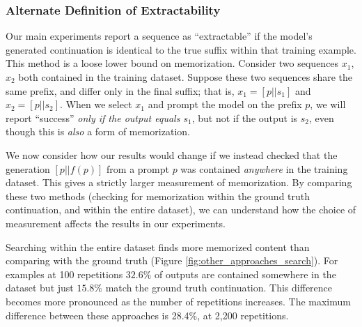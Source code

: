 \subsubsection{Alternate Definition of Extractability}
Our main experiments report a sequence as ``extractable'' if the model's generated continuation is identical to the true suffix within that training example.
This method is a loose lower bound on memorization.
Consider two sequences $x_1$, $x_2$ both contained in the training dataset.
Suppose these two sequences share the same prefix, and differ only in the final suffix;
that is, $x_1 = [p || s_1]$ and $x_2 = [p || s_2]$.
When we select $x_1$ and prompt the model on the prefix $p$, we will 
report ``success'' \emph{only if the output equals $s_1$}, but not if the output is $s_2$,
even though this is \emph{also} a form of memorization.
%

We now consider how our results would change if we instead checked that the generation $[p || f(p)]$ from a prompt $p$ was contained \emph{anywhere} in the training dataset. This gives a strictly larger measurement of memorization.
By comparing these two methods (checking for memorization within the ground truth continuation, and within the entire dataset), we can understand how the choice of measurement affects the results in our experiments. 



Searching within the entire dataset finds more memorized content than comparing with the ground truth (Figure \ref{fig:other_approaches_search}). 
For examples at 100 repetitions $32.6\%$ of outputs are contained somewhere in the dataset but just $15.8\%$ match the ground truth continuation.
This difference becomes more pronounced as the number of repetitions increases. 
The maximum difference between these approaches is 28.4\%, at 2{,}200 repetitions.

